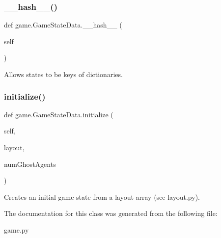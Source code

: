 \subsubsection{\texorpdfstring{\+\_\+\+\_\+hash\+\_\+\+\_\+()}{\_\_hash\_\_()}}
{\footnotesize\ttfamily def game.\+Game\+State\+Data.\+\_\+\+\_\+hash\+\_\+\+\_\+ (\begin{DoxyParamCaption}\item[{}]{self }\end{DoxyParamCaption})}

\begin{DoxyVerb}Allows states to be keys of dictionaries.
\end{DoxyVerb}
 \mbox{\label{classgame_1_1_game_state_data_a6d54572aa8882da95c81921b89c0791b}} 
\subsubsection{\texorpdfstring{initialize()}{initialize()}}
{\footnotesize\ttfamily def game.\+Game\+State\+Data.\+initialize (\begin{DoxyParamCaption}\item[{}]{self,  }\item[{}]{layout,  }\item[{}]{num\+Ghost\+Agents }\end{DoxyParamCaption})}

\begin{DoxyVerb}Creates an initial game state from a layout array (see layout.py).
\end{DoxyVerb}
 

The documentation for this class was generated from the following file\+:\begin{DoxyCompactItemize}
\item 
game.\+py\end{DoxyCompactItemize}
